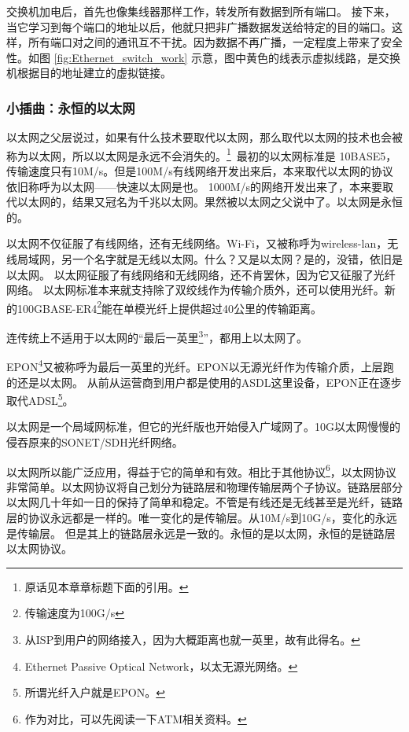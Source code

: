 
交换机加电后，首先也像集线器那样工作，转发所有数据到所有端口。
接下来，当它学习到每个端口的地址以后，他就只把非广播数据发送给特定的目的端口。这样，所有端口对之间的通讯互不干扰。因为数据不再广播，一定程度上带来了安全性。如图 \ref{fig:Ethernet_switch_work} 示意，图中黄色的线表示虚拟线路，是交换机根据目的地址建立的虚拟链接。

\subsubsection*{小插曲：永恒的以太网}
以太网之父层说过，如果有什么技术要取代以太网，那么取代以太网的技术也会被称为以太网，所以以太网是永远不会消失的。\hspace{-0.5em}\footnote{原话见本章章标题下面的引用。}~最初的以太网标准是 10BASE5， 传输速度只有10M/s。但是100M/s有线网络开发出来后，本来取代以太网的协议依旧称呼为以太网——快速以太网是也。
1000M/s的网络开发出来了，本来要取代以太网的，结果又冠名为千兆以太网。果然被以太网之父说中了。以太网是永恒的。

以太网不仅征服了有线网络，还有无线网络。Wi-Fi，又被称呼为wireless-lan，无线局域网，另一个名字就是无线以太网。什么？又是以太网？是的，没错，依旧是以太网。
以太网征服了有线网络和无线网络，还不肯罢休，因为它又征服了光纤网络。
以太网标准本来就支持除了双绞线作为传输介质外，还可以使用光纤。新的100GBASE-ER4\footnote{传输速度为100G/s}能在单模光纤上提供超过40公里的传输距离。

连传统上不适用于以太网的“最后一英里\footnote{从ISP到用户的网络接入，因为大概距离也就一英里，故有此得名。}”，都用上以太网了。

EPON\footnote{Ethernet Passive Optical Network，以太无源光网络。}又被称呼为最后一英里的光纤。EPON以无源光纤作为传输介质，上层跑的还是以太网。
从前从运营商到用户都是使用的ASDL这里设备，EPON正在逐步取代ADSL\footnote{所谓光纤入户就是EPON。}。%

以太网是一个局域网标准，但它的光纤版也开始侵入广域网了。10G以太网慢慢的侵吞原来的SONET/SDH光纤网络。

以太网所以能广泛应用，得益于它的简单和有效。相比于其他协议\footnote{作为对比，可以先阅读一下ATM相关资料。}，以太网协议非常简单。以太网协议将自己划分为链路层和物理传输层两个子协议。链路层部分以太网几十年如一日的保持了简单和稳定。不管是有线还是无线甚至是光纤，链路层的协议永远都是一样的。唯一变化的是传输层。从10M/s到10G/s，变化的永远是传输层。
但是其上的链路层永远是一致的。永恒的是以太网，永恒的是链路层以太网协议。

